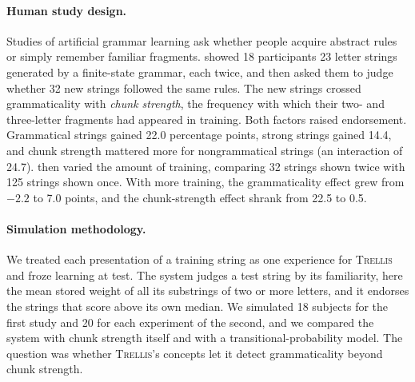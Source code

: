 \documentclass[11pt,letterpaper]{article}
\newcommand{\trellis}{\textsc{Trellis}}
\begin{document}
\paragraph{Human study design.} Studies of artificial grammar learning ask whether people
acquire abstract rules or simply remember familiar fragments. \citet{knowlton-squire-agl}
showed 18 participants 23 letter strings generated by a finite-state grammar, each twice,
and then asked them to judge whether 32 new strings followed the same rules. The new
strings crossed grammaticality with {\it chunk strength\/}, the frequency with which their
two- and three-letter fragments had appeared in training. Both factors raised
endorsement. Grammatical strings gained 22.0 percentage points, strong strings gained 14.4,
and chunk strength mattered more for nongrammatical strings (an interaction of 24.7).
\citet{meulemans-vdl-acs} then varied the amount of training, comparing 32 strings shown
twice with 125 strings shown once. With more training, the grammaticality effect grew
from $-2.2$ to 7.0 points, and the chunk-strength effect shrank from 22.5 to 0.5.

\paragraph{Simulation methodology.} We treated each presentation of a training string as
one experience for \trellis{} and froze learning at test. The system judges a test string
by its familiarity, here the mean stored weight of all its substrings of two or more
letters, and it endorses the strings that score above its own median. We simulated 18
subjects for the first study and 20 for each experiment of the second, and we compared
the system with chunk strength itself and with a transitional-probability model. The
question was whether \trellis{}'s concepts let it detect grammaticality beyond chunk
strength.
\end{document}
